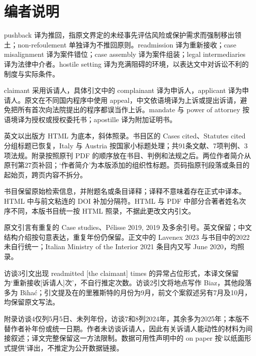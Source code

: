 \documentclass[10pt,a4paper]{article}
\begin{document}
\section*{编者说明}
pushback 译为推回，指原文界定的未经事先评估风险或保护需求而强制移出领土；non-refoulement 单独译为不推回原则。readmission 译为重新接收；case misalignment 译为案件错位；case assembly 译为案件组装；legal intermediaries 译为法律中介者。hostile setting 译为充满阻碍的环境，以表达文中对诉讼不利的制度与实际条件。\par
claimant 采用诉请人，具体引文中的 complainant 译为申诉人，applicant 译为申请人。原文在不同国内程序中使用 appeal，中文依语境译为上诉或提出诉请，避免把所有首次向法院提出的程序都误当作上诉。mandate 与 power of attorney 按语境译为授权或授权委托书；apostille 译为附加证明书。\par
英文以出版方 HTML 为底本，斜体照录。书目区的 Cases cited、Statutes cited 分组标题已恢复，Italy 与 Austria 按国家小标题处理；共91条文献、7项判例、3项法规。附录按照原刊 PDF 的顺序放在书目、判例和法规之后。两位作者简介从原刊第27页补回；‘作者简介’为本版添加的组织性标题。页码指原刊段落或条目的起始页，跨页内容不拆分。\par
书目保留原始检索信息，并附题名或条目译释；译释不意味着存在正式中译本。HTML 中与前文粘连的 DOI 补加分隔符。HTML 与 PDF 中部分合著者姓名次序不同，本版书目统一按 HTML 照录，不据此更改文内引文。\par
原文引言有重复的 Case studies、Pélisse 2019, 2019 及多余引号。英文保留；中文结构介绍按句意表达，重复年份仍保留。正文中的 Lavenex 2023 与书目中的2022未自行统一；Italian Ministry of the Interior 2021 条目内又写 June 2020，均照录。\par
访谈3引文出现 readmitted [the claimant] times 的异常占位形式，本译文保留为‘重新接收[诉请人]次’，不自行推定次数。访谈2引文将地点写作 Biaz，其他段落多为 Bihać；引文提及在的里雅斯特的月份为9月，前文个案叙述另有7月及10月，均保留原文写法。\par
附录访谈4仅列5月5日、未列年份，访谈7和8列2024年，其余多为2025年；本版不替作者补年份或统一日期。作者未访谈诉请人，因此有关诉请人能动性的材料为间接叙述；译文完整保留这一方法限制。数据可用性声明中的 on paper 按‘以纸面形式提供’译出，不推定为公开数据链接。\par
\end{document}

